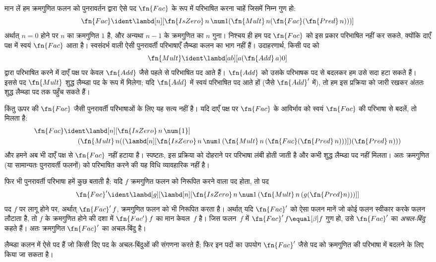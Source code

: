 \documentclass[../../../include/open-logic-section]{subfiles}
\begin{document}


मान लें हम क्रमगुणित फलन को पुनरावर्तन द्वारा ऐसे पद $\fn{Fac}$ के रूप में
परिभाषित करना चाहें जिसमें निम्न गुण हो:
\[
\fn{Fac} \ident \lambd[n][\fn{IsZero}\, n\, \num 1 (\fn{Mult}\, n (\fn{Fac}(\fn{Pred} \, n)))]
\]
अर्थात् $n = 0$ होने पर $n$ का क्रमगुणित $1$ है, और अन्यथा $n-1$ के
क्रमगुणित का $n$ गुना। निश्चय ही हम पद $\fn{Fac}$ को इस प्रकार परिभाषित
नहीं कर सकते, क्योंकि दाएँ पक्ष में स्वयं $\fn{Fac}$ आता है। स्वसंदर्भ
वाली ऐसी पुनरावर्ती परिभाषाएँ लैम्ब्डा कलन का भाग नहीं हैं। उदाहरणार्थ,
किसी पद को
\[
\fn{Mult} \ident \lambd[ab][a (\fn{Add}\, a) 0]
\]
द्वारा परिभाषित करने में दाएँ पक्ष पर केवल $\fn{Add}$ जैसे पहले से
परिभाषित पद आते हैं। $\fn{Add}$ को उसके परिभाषक पद से बदलकर हम उसे सदा
हटा सकते हैं। इससे पद $\fn{Mult}$ शुद्ध लैम्ब्डा पद के रूप में मिलेगा; यदि
$\fn{Add}$ में स्वयं परिभाषित पद आते हों (जैसे $\fn{Add}'$ में), तो हम इस
प्रक्रिया को जारी रखकर अंततः शुद्ध लैम्ब्डा पद तक पहुँच सकते हैं।

किंतु ऊपर की $\fn{Fac}$ जैसी पुनरावर्ती परिभाषाओं के लिए यह सत्य नहीं है।
यदि दाएँ पक्ष पर $\fn{Fac}$ के आविर्भाव को स्वयं $\fn{Fac}$ की परिभाषा से
बदलें, तो मिलता है:
\begin{align*}
  \fn{Fac} & \ident \lambd[n][\fn{IsZero}\, n\, \num{1}] \\
    & \qquad (\fn{Mult}\, n
  ((\lambd[n][\fn{IsZero} \, n \, \num 1\, (\fn{Mult}\, n\, (\fn{Fac}
    (\fn{Pred}\, n)))]) (\fn{Pred}\, n)))
\end{align*}
और हमने अब भी दाएँ पक्ष से $\fn{Fac}$ नहीं हटाया है। स्पष्टतः, इस प्रक्रिया
को दोहराने पर परिभाषा लंबी होती जाती है और कभी शुद्ध लैम्ब्डा पद नहीं
मिलता। अतः क्रमगुणित (या सामान्यतः पुनरावर्ती फलनों) को परिभाषित करने की
यह विधि व्यावहारिक नहीं है।

फिर भी पुनरावर्ती परिभाषा हमें कुछ बताती है: यदि $f$ क्रमगुणित फलन को
निरूपित करने वाला पद होता, तो पद
\[
\fn{Fac}' \ident \lambd[g][\lambd[n][\fn{IsZero} \, n \, \num 1\, (\fn{Mult} \, n\, (g (\fn{Pred} n)))]]
\]
पद $f$ पर लागू होने पर, अर्थात् $\fn{Fac}'\,f$, क्रमगुणित फलन को भी
निरूपित करता है। अर्थात् यदि $\fn{Fac}'$ को ऐसा फलन मानें जो कोई फलन
स्वीकार करके फलन लौटाता है, तो $f$ के क्रमगुणित होने की दशा में
$\fn{Fac'}\, f$ का मान केवल~$f$ है। जिस फलन~$f$ में $\fn{Fac}' \, f
\equal[\beta] f$ गुण हो, उसे $\fn{Fac}'$ का \emph{अचल-बिंदु} कहते हैं। अतः
क्रमगुणित $\fn{Fac}'$ का अचल-बिंदु है।

लैम्ब्डा कलन में ऐसे पद हैं जो किसी दिए पद के अचल-बिंदुओं की संगणना करते
हैं; फिर इन पदों का उपयोग $\fn{Fac}'$ जैसे पद को क्रमगुणित की परिभाषा में
बदलने के लिए किया जा सकता है।
\end{document}
